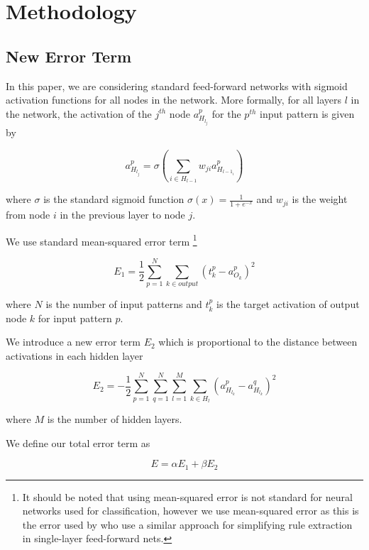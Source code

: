 \section{Methodology}
\label{sec:method}

\subsection{New Error Term}
\label{sec:nn}

In this paper, we are considering standard feed-forward networks with
sigmoid activation functions for all nodes in the network. More formally,
for all layers $l$ in the network, the activation of the $j^{th}$ node
$a_{H_{l_j}}^p$ for the $p^{th}$ input pattern is given by

\begin{equation}
  a_{H_{l_j}}^p = \sigma(\sum_{i\in H_{l-1}}{w_{ji}a_{H_{l-1_i}}^p})
\end{equation}

where $\sigma$ is the standard sigmoid function $\sigma(x)=\frac{1}{1+e^{-x}}$
and $w_{ji}$ is the weight from node $i$ in the previous layer to node $j$.

We use standard mean-squared error term
\footnote{
It should be noted that using
mean-squared error is not standard for neural networks used for
classification, however we use mean-squared error as this is the error
used by \cite{thuan11} who use a similar approach for simplifying rule
extraction in single-layer feed-forward nets.
}

\begin{equation}
  E_1 = \frac{1}{2}\sum_{p=1}^{N} \sum_{k \in output} (t_k^p-a_{O_k}^p)^2
\end{equation}

where $N$ is the number of input patterns and $t_k^p$ is the target activation
of output node $k$ for input pattern $p$.

We introduce a new error term $E_2$ which is proportional to the distance between
activations in each hidden layer

\begin{equation}
  E_2 = -\frac{1}{2}\sum_{p=1}^{N} \sum_{q=1}^{N} \sum_{l=1}^{M} \sum_{k \in H_l} (a_{H_{l_k}}^p - a_{H_{l_k}}^q)^2
\end{equation}

where $M$ is the number of hidden layers.

We define our total error term as

\begin{equation}
  E = \alpha E_1 + \beta E_2
\end{equation}

